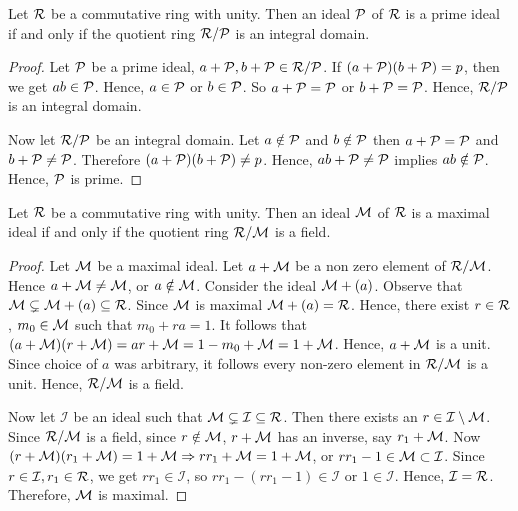 \begin{prop}
  Let $\mathcal{R}$ be a commutative ring with unity. Then an ideal $\mathcal{P}$ of $\mathcal{R}$ is a prime ideal if and only if the quotient ring $\mathcal{R}/\mathcal{P}$ is an integral domain.
\end{prop}
\begin{proof}
  Let $\mathcal{P}$ be a prime ideal, $a+\mathcal{P}, b+\mathcal{P} \in \mathcal{R}/\mathcal{P}$. If $(a+\mathcal{P})(b+\mathcal{P})=p$, then we get $ab \in \mathcal{P}$. Hence, $a\in \mathcal{P}$ or $b\in \mathcal{P}$. So $a+\mathcal{P} = \mathcal{P}$ or $b+\mathcal{P} = \mathcal{P}$. Hence, $\mathcal{R}/\mathcal{P}$ is an integral domain.

  Now let $\mathcal{R}/\mathcal{P}$ be an integral domain. Let $a\notin \mathcal{P}$ and $b\notin \mathcal{P}$ then $a+\mathcal{P} = \mathcal{P}$ and $b+\mathcal{P} \neq \mathcal{P}$. Therefore $(a+\mathcal{P})(b+\mathcal{P})\neq p$. Hence, $ab+\mathcal{P} \neq \mathcal{P}$ implies $ab\notin \mathcal{P}$. Hence, $\mathcal{P}$ is prime.
\end{proof}

\begin{prop}
  Let $\mathcal{R}$ be a commutative ring with unity. Then an ideal $\mathcal{M}$ of $\mathcal{R}$ is a maximal ideal if and only if the quotient ring $\mathcal{R}/\mathcal{M}$ is a field.
\end{prop}

\begin{proof}
  Let $\mathcal{M}$ be a maximal ideal. Let $a+\mathcal{M}$ be a non zero element of $\mathcal{R}/\mathcal{M}$. Hence $a+\mathcal{M} \neq \mathcal{M}$, or $a\notin \mathcal{M}$. Consider the ideal $\mathcal{M} + (a)$. Observe that $\mathcal{M} \subsetneq \mathcal{M} + (a)\subseteq \mathcal{R}$. Since $\mathcal{M}$ is maximal $\mathcal{M} + (a)=\mathcal{R}$. Hence, there exist $r\in \mathcal{R}$, $m_0\in \mathcal{M}$ such that $m_0 + ra = 1$.
  It follows that $(a+\mathcal{M})(r+\mathcal{M}) = ar + \mathcal{M} = 1-m_0 + \mathcal{M} = 1 + \mathcal{M}$. Hence, $a+\mathcal{M}$ is a unit. Since choice of $a$ was arbitrary, it follows every non-zero element in $\mathcal{R}/\mathcal{M}$ is a unit. Hence, $\mathcal{R}/\mathcal{M}$ is a field.

  Now let $\mathcal{I}$ be an ideal such that $\mathcal{M}\subsetneq \mathcal{I}\subseteq \mathcal{R}$. Then there exists an $r\in \mathcal{I}\setminus \mathcal{M}$. Since $\mathcal{R}/\mathcal{M}$ is a field, since $r\notin \mathcal{M}$, $r+\mathcal{M}$ has an inverse, say $r_1 + \mathcal{M}$. Now $(r+\mathcal{M})(r_1 + \mathcal{M}) = 1 + \mathcal{M} \Rightarrow rr_1 + \mathcal{M} = 1 + \mathcal{M}$,
  or $rr_1 - 1 \in \mathcal{M} \subset \mathcal{I}$. Since $r\in \mathcal{I}, r_1\in \mathcal{R}$, we get $rr_1 \in \mathcal{I}$, so $rr_1 - (rr_1 -1)\in \mathcal{I}$ or $1\in \mathcal{I}$. Hence, $\mathcal{I} = \mathcal{R}$. Therefore, $\mathcal{M}$ is maximal.
\end{proof}


